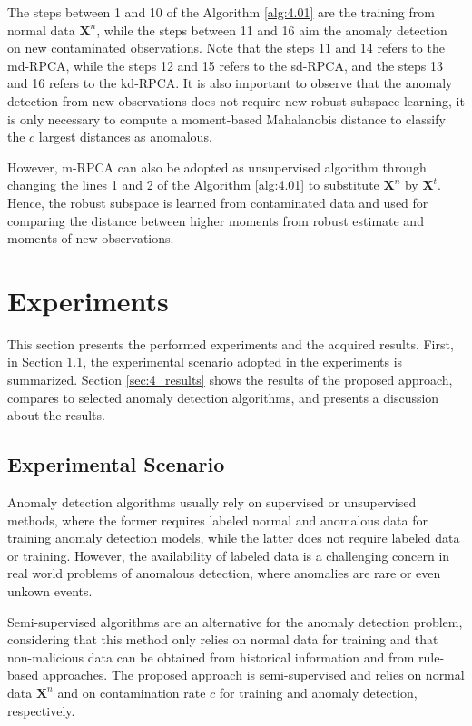 The steps between 1 and 10 of the Algorithm \ref{alg:4.01} are the training from normal data $\boldsymbol{X}^n$, while the steps between 11 and 16 aim the anomaly detection on new contaminated observations. Note that the steps 11 and 14 refers to the md-RPCA, while the steps 12 and 15 refers to the sd-RPCA, and the steps 13 and 16 refers to the kd-RPCA. It is also important to observe that the anomaly detection from new observations does not require new robust subspace learning, it is only necessary to compute a moment-based Mahalanobis distance to classify the $c$ largest distances as anomalous.

However, m-RPCA can also be adopted as unsupervised algorithm through changing the lines 1 and 2 of the Algorithm \ref{alg:4.01} to substitute $\boldsymbol{X}^n$ by $\boldsymbol{X}^t$. Hence, the robust subspace is learned from contaminated data and used for comparing the distance between higher moments  from robust estimate and moments of new observations.

\section{Experiments}
\label{sec:4_experiments}

This section presents the performed experiments and the acquired results. First, in Section \ref{sec:4_AnalyzedScenario}, the experimental scenario adopted in the experiments is summarized. Section \ref{sec:4_results} shows the results of the proposed approach, compares to selected anomaly detection algorithms, and presents a discussion about the results.

\subsection{Experimental Scenario}
\label{sec:4_AnalyzedScenario}

Anomaly detection algorithms usually rely on supervised or unsupervised methods, where the former requires labeled normal and anomalous data for training anomaly detection models, while the latter does not require labeled data or training. However, the availability of labeled data is a challenging concern in real world problems of anomalous detection, where anomalies are rare or even unkown events. 

Semi-supervised algorithms are an alternative for the anomaly detection problem, considering that this method only relies on normal data for training and that non-malicious data can be obtained from historical information and from rule-based approaches. The proposed approach is semi-supervised and relies on normal data $\boldsymbol{X}^n$ and on contamination rate $c$ for training and anomaly detection, respectively.

